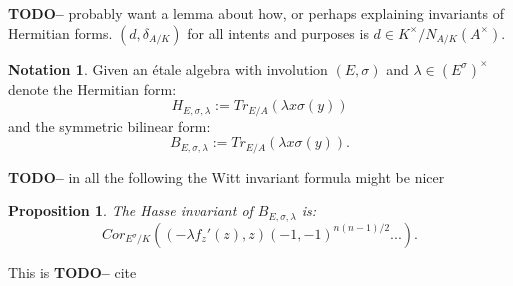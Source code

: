 \documentclass{article}
\theoremstyle{plain}
\newtheorem{proposition}[theorem]{Proposition}
\theoremstyle{definition}
\newtheorem{notation}[theorem]{Notation}
\newcommand{\TODO}[1]{\textbf{TODO-#1}}
\begin{document}
\TODO - probably want a lemma about how, or perhaps explaining invariants of Hermitian forms.
$(d,\delta_{A/K}) $ for all intents and purposes is $d \in K^\times/N_{A/K}(A^\times)$.

\begin{notation}
Given an \'etale algebra with involution $(E,\sigma)$ and $\lambda \in (E^\sigma)^\times$
denote the Hermitian form:
\[ H_{E,\sigma,\lambda} := Tr_{E/A}(\lambda x\sigma(y)) \]
and the symmetric bilinear form:
\[ B_{E,\sigma,\lambda} := Tr_{E/A}(\lambda x\sigma(y)). \]
\end{notation}

\TODO - in all the following the Witt invariant formula might be nicer

\begin{proposition}\label{prop:Hasse}
The Hasse invariant of $B_{E,\sigma,\lambda}$ is:
\[ Cor_{E^\sigma/K}((-\lambda f_z'(z),z)(-1,-1)^{n(n-1)/2}...). \]
\end{proposition}
This is \TODO - cite
\end{document}
